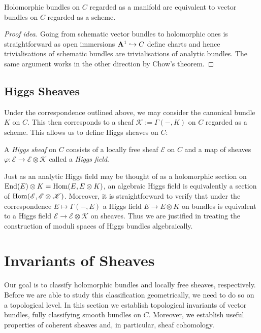 \documentclass[12pt]{ociamthesis}  %
\begin{document}
\begin{lemma}
  Holomorphic bundles on $C$ regarded as a manifold are equivalent
  to vector bundles on $C$ regarded as a scheme.
  \begin{proof}[Proof idea]
    Going from schematic vector bundles to holomorphic ones
    is straightforward as open immersions $\mathbf{A}^{1}_{}\hookrightarrow C$
    define charts and hence trivialisations of schematic
    bundles are trivialisations of analytic bundles.
    The same argument works in the other direction by Chow's
    theorem.
  \end{proof}
\end{lemma}

\subsection{Higgs Sheaves}

Under the correspondence outlined above, we may consider the canonical
bundle $K$ on $C$. This then corresponds to a sheaf
$\mathscr K := \Gamma(-,K)$
on $C$ regarded as a scheme. This allows us to define Higgs
sheaves on $C$:

\begin{definition}
  A \emph{Higgs sheaf} on $C$ consists of a locally free sheaf
  $\mathscr E$ on $C$ and a map of sheaves
  $\varphi : \mathscr E \to \mathscr E \otimes \mathscr K$
  called a \emph{Higgs field}.
\end{definition}

Just as an analytic Higgs field may be thought of as a holomorphic
section on $\operatorname{End}(E)\otimes K = \operatorname{Hom}(E,E\otimes K)$, an algebraic
Higgs field is equivalently a section of $\operatorname{Hom}(\mathscr E,\mathscr E\otimes\mathscr K)$.
Moreover, it is straightforward to verify that under the correspondence
$E\mapsto\Gamma(-,E)$ a Higgs field $E\to E\otimes K$ on bundles is
equivalent to a Higgs field $\mathscr E\to\mathscr E\otimes\mathscr K$
on sheaves.
Thus we are justified in treating the construction of moduli
spaces of Higgs bundles algebraically.

\section{Invariants of Sheaves}

Our goal is to classify holomorphic bundles and locally free sheaves,
respectively. Before we are able to study this classification
geometrically, we need to do so on a topological level. In this
section we establish topological invariants of vector bundles,
fully classifying smooth bundles on $C$. Moreover, we establish
useful properties of coherent sheaves and, in particular, sheaf
cohomology.
\end{document}
